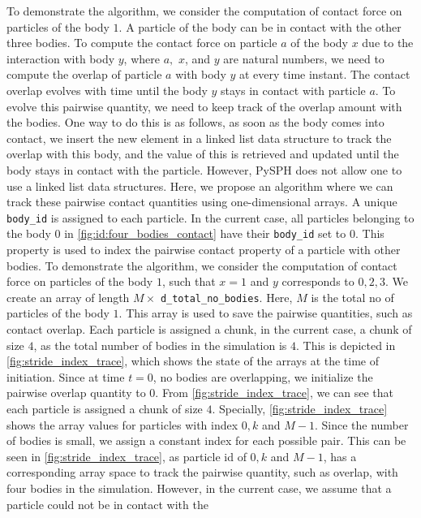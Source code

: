 To demonstrate the algorithm, we consider the computation of contact force on
particles of the body $1$. A particle of the body can be in contact with the
other three bodies. To compute the contact force on particle $a$ of the body $x$
due to the interaction with body $y$, where $a,$ $x$, and $y$ are natural
numbers, we need to compute the overlap of particle $a$ with body $y$ at every
time instant. The contact overlap evolves with time until the body $y$ stays in
contact with particle $a$. To evolve this pairwise quantity, we need to keep
track of the overlap amount with the bodies. One way to do this is as follows,
as soon as the body comes into contact, we insert the new element in a linked
list data structure to track the overlap with this body, and the value of this
is retrieved and updated until the body stays in contact with the particle.
However, PySPH does not allow one to use a linked list data structures. Here, we
propose an algorithm where we can track these pairwise contact quantities using
one-dimensional arrays. A unique \texttt{body\_id} is assigned to each particle.
In the current case, all particles belonging to the body $0$ in
\cref{fig:id:four_bodies_contact} have their \texttt{body\_id} set to $0$. This
property is used to index the pairwise contact property of a particle with other
bodies. To demonstrate the algorithm, we consider the computation of contact
force on particles of the body $1$, such that $x=1$ and $y$ corresponds to
$0, 2, 3$. We create an array of length $M \times$
\texttt{d\_total\_no\_bodies}. Here, $M$ is the total no of particles of the
body $1$. This array is used to save the pairwise quantities, such as contact
overlap. Each particle is assigned a chunk, in the current case, a chunk of size
$4$, as the total number of bodies in the simulation is $4$. This is depicted in
\cref{fig:stride_index_trace}, which shows the state of the arrays at the time
of initiation. Since at time $t=0$, no bodies are overlapping, we initialize the
pairwise overlap quantity to $0$. From \cref{fig:stride_index_trace}, we can see
that each particle is assigned a chunk of size $4$. Specially,
\cref{fig:stride_index_trace} shows the array values for particles with index
$0, k$ and $M-1$. Since the number of bodies is small, we assign a constant
index for each possible pair. This can be seen in \cref{fig:stride_index_trace},
as particle id of $0, k$ and $M-1$, has a corresponding array space to track the
pairwise quantity, such as overlap, with four bodies in the simulation. However,
in the current case, we assume that a particle could not be in contact with the
